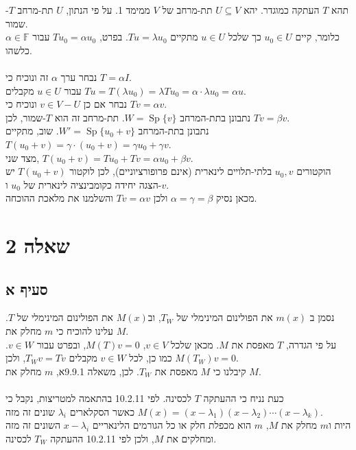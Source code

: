 \documentclass{article}
\def\field{\mathbb{F}}
\DeclareMathOperator{\Sp}{Sp}
\begin{document}
תהא $T$ העתקה כמוגדר.
יהא $U\subseteq V$ תת-מרחב של $V$ ממימד 1. על פי הנתון, $U$ תת-מרחב $T$-שמור. \\
כלומר, קיים $u_0\in U$ כך שלכל $u\in U$ מתקיים $Tu=\lambda u_0$. בפרט, $Tu_0=\alpha u_0$ עבור $\alpha\in \field$ כלשהו.\\\\
נבחר ערך $\alpha$ זה ונוכיח כי $T=\alpha I$. \\
עבור $u\in U$ מקבלים $Tu=T(\lambda u_0)= \lambda Tu_0 = \alpha \cdot \lambda u_0=\alpha u$. \\
נבחר אם כן $v\in V - U$ ונוכיח כי $Tv=\alpha v$. \\
נתבונן בתת-המרחב $W=\Sp\{v\}$. תת-מרחב זה הוא $T$-שמור, לכן $Tv=\beta v$. \\
נתבונן בתת-המרחב $W'=\Sp\{ u_0+v \}$. שוב, מתקיים $T(u_0+v)=\gamma \cdot (u_0+v)=\gamma u_0+\gamma v$.\\
מצד שני, $T(u_0+v)=Tu_0+Tv=\alpha u_0 + \beta v$. \\
הוקטורים $u_0,v$ בלתי-תלויים לינארית (אינם פרופורציוניים), לכן לוקטור $T(u_0+v)$ יש הצגה יחידה כקומבינציה לינארית של $u_0$ ו-$v$. \\
מכאן נסיק $\alpha=\gamma=\beta$ ולכן $Tv=\alpha v$ והשלמנו את מלאכת ההוכחה.

\pagebreak

\section*{שאלה 2}

\subsection*{סעיף א}

נסמן ב $m(x)$ את הפולינום המינימלי של $T_W$, וב$M(x)$ את הפולינום המינימלי של $T$. עלינו להוכיח כי $m$ מחלק את $M$.\\
על פי הגדרה, $T$ מאפסת את $M$. מכאן שלכל $v\in V$, $M(T)v=0$, ובפרט עבור $v\in W$.
כמו כן, לכל $v\in W$ מקבלים $T_Wv=Tv$, ולכן $M(T_W)v=0$. \\
קיבלנו כי $M$ מאפסת את $T_W$. לכן, משאלה 9.9.1א, $m$ מחלק את $M$. \\\\
כעת נניח כי ההעתקה $T$ לכסינה. לפי 10.2.11 בהתאמה למטריצות, נקבל כי $M(x)=(x-\lambda_1)(x-\lambda_2)\cdots(x-\lambda_k)$ כאשר הסקלארים $\lambda_i$ שונים זה מזה. \\
היות ו$m$ מחלק את $M$, $m$ הוא מכפלת חלק או כל הגורמים הלינאריים $x-\lambda_i$ השונים זה מזה ומחלקים את $M$, ולכן לפי 10.2.11 ההעתקה $T_W$ לכסינה.
\end{document}
